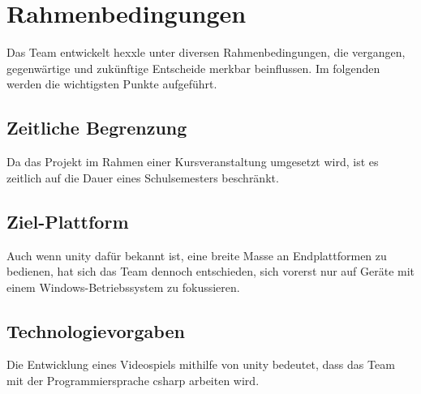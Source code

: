 \documentclass[../main.tex]{subfiles}
\begin{document}
	\section{Rahmenbedingungen}
	\par Das Team entwickelt \gls{hexxle} unter diversen Rahmenbedingungen, die vergangen, gegenwärtige und zukünftige Entscheide merkbar beinflussen. Im folgenden werden die wichtigsten Punkte aufgeführt.
	
	\subsection{Zeitliche Begrenzung}
	\par Da das Projekt im Rahmen einer Kursveranstaltung umgesetzt wird, ist es zeitlich auf die Dauer eines Schulsemesters beschränkt.
	
	\subsection{Ziel-Plattform}
	\par Auch wenn \gls{unity} dafür bekannt ist, eine breite Masse an Endplattformen zu bedienen, hat sich das Team dennoch entschieden, sich vorerst nur auf Geräte mit einem Windows-Betriebssystem zu fokussieren.
	
	\subsection{Technologievorgaben}
	\par Die Entwicklung eines Videospiels mithilfe von \gls{unity} bedeutet, dass das Team mit der Programmiersprache \gls{csharp} arbeiten wird.
\end{document}
